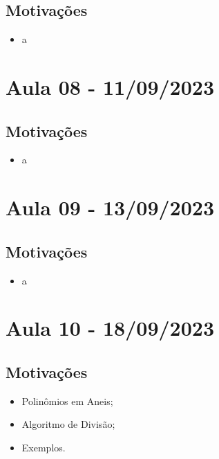 \documentclass{article}
\begin{document}
\subsection{Motivações}
\begin{itemize}
  \item a
\end{itemize}
\newpage

\section{Aula 08 - 11/09/2023}
\subsection{Motivações}
\begin{itemize}
  \item a
\end{itemize}
\newpage

\section{Aula 09 - 13/09/2023}
\subsection{Motivações}
\begin{itemize}
  \item a
\end{itemize}
\newpage

\section{Aula 10 - 18/09/2023}
\subsection{Motivações}
\begin{itemize}
\item Polinômios em Aneis;
\item Algoritmo de Divisão;
\item Exemplos.
\end{itemize}
\end{document}
